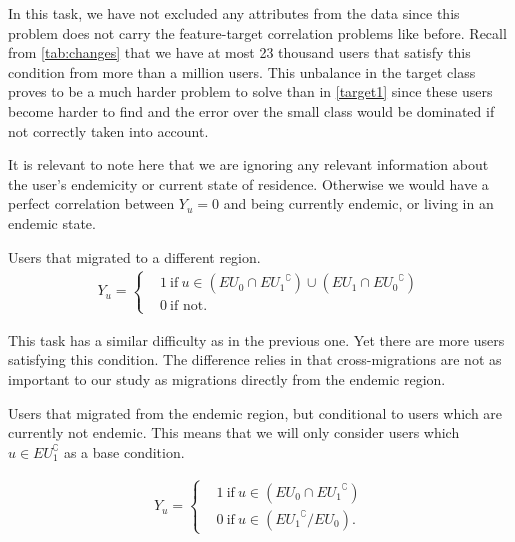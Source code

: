 In this task, we have not excluded any attributes from the data since this problem does not carry the feature-target correlation problems like before.
Recall from \cref{tab:changes} that we have at most 23 thousand users that satisfy this condition from more than a million users.
This unbalance in the target class proves to be a much harder problem to solve than in \cref{target1} since these users become harder to find and the error over the small class would be dominated if not correctly taken into account.

It is relevant to note here that we are ignoring any relevant information about the user's endemicity or current state of residence.
Otherwise we would have a perfect correlation between $Y_u=0$ and being currently endemic, or living in an endemic state.



\begin{problem}\label{target3}
Users that migrated to a different region.
\begin{align*}
			Y_u =
			\begin{cases}
				&1 \ \mbox{if} \ u \in (EU_{0} \cap { EU_{1} }^{\complement}) \cup (EU_{1} \cap { EU_{0} }^{\complement}) \\
				&0 \ \mbox{if not}.
			\end{cases}
		\end{align*}
\end{problem}

This task has a similar difficulty as in the previous one.
Yet there are more users satisfying this condition.
The difference relies in that cross-migrations are not as important to our study as migrations directly from the endemic region.


\begin{problem}\label{target4}
Users that migrated from the endemic region, but conditional to users which are currently not endemic.
This means that we will only consider users which $u \in EU_{1}^{\complement}$ as a base condition.

\begin{align*}
			Y_u =
			\begin{cases}
				& 1 \ \mbox{if} \ u \in ( EU_{0} \cap { EU_{1} }^{\complement})    \\
				& 0 \ \mbox{if} \ u \in ( { EU_{1} }^{\complement} / EU_{0}).
			\end{cases}
		\end{align*}
\end{problem}

